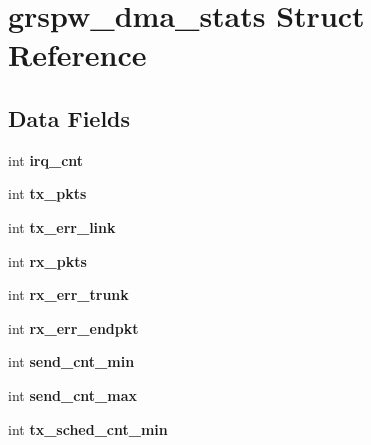 \hypertarget{structgrspw__dma__stats}{}\section{grspw\+\_\+dma\+\_\+stats Struct Reference}
\label{structgrspw__dma__stats}
\subsection*{Data Fields}
\begin{DoxyCompactItemize}
\item 
\mbox{\label{structgrspw__dma__stats_a094865aad9c0c149a34fbf40c2d5bd43}} 
int {\bfseries irq\+\_\+cnt}
\item 
\mbox{\label{structgrspw__dma__stats_a585267d787d12a30db2b5d3267e6b6b4}} 
int {\bfseries tx\+\_\+pkts}
\item 
\mbox{\label{structgrspw__dma__stats_a8c7ba6bab29b9aab6d07633cd88b750e}} 
int {\bfseries tx\+\_\+err\+\_\+link}
\item 
\mbox{\label{structgrspw__dma__stats_a920916654baba295e52857f48a9d931c}} 
int {\bfseries rx\+\_\+pkts}
\item 
\mbox{\label{structgrspw__dma__stats_ab1245d621300afb967b00d8663bcbffa}} 
int {\bfseries rx\+\_\+err\+\_\+trunk}
\item 
\mbox{\label{structgrspw__dma__stats_afba6f4e258253cb8626889d10c73784b}} 
int {\bfseries rx\+\_\+err\+\_\+endpkt}
\item 
\mbox{\label{structgrspw__dma__stats_a516ff24d6f4f0c06741a7cfd9b0e6a97}} 
int {\bfseries send\+\_\+cnt\+\_\+min}
\item 
\mbox{\label{structgrspw__dma__stats_ab7b04f6fd3b167cbddd54c57a7d5772a}} 
int {\bfseries send\+\_\+cnt\+\_\+max}
\item 
\mbox{\label{structgrspw__dma__stats_ae42e8bdda8201bc99bfc33773d535a51}} 
int {\bfseries tx\+\_\+sched\+\_\+cnt\+\_\+min}

\end{DoxyCompactItemize}
